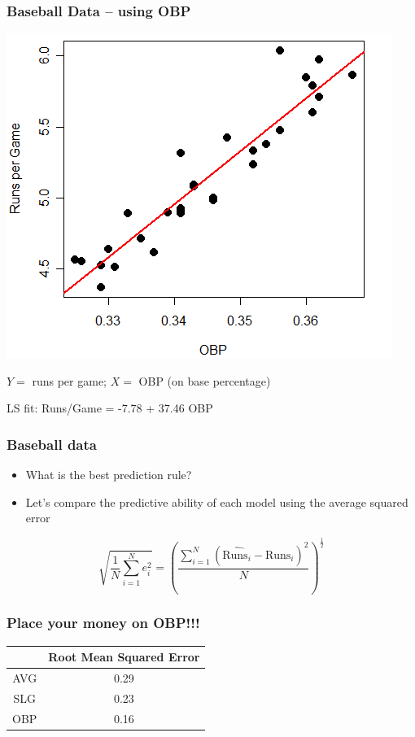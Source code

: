 \documentclass{beamer}
\newcommand{\bo}[1]{\textcolor{burntorange}{#1}}
\newcommand{\bi}{\begin{itemize}}
\newcommand{\ib}{\end{itemize}}
\begin{document}
\begin{frame}
\frametitle{Baseball Data -- using OBP} 

\vspace{-5.8mm}
\begin{center}
\includegraphics[scale=0.42]{figures/OBPR.png}
\end{center}

\vspace{-5.8mm}
$Y=$ runs per game; $X=$ OBP (on base percentage)

\vspace{1mm}
LS fit: {\color{red} Runs/Game = -7.78 + 37.46 OBP}
\end{frame}


\begin{frame}
\frametitle{Baseball data}
\bi
\item {\bo{ What is the best prediction rule?}}
\item Let's compare the predictive ability of each model using the average squared error
\ib

$$
\sqrt{\frac{1}{N}\sum_{i=1}^N{e_i^2}}  = \left(\frac{\sum_{i=1}^N{\left(\widehat{\text{Runs}_i} - \text{Runs}_i \right)^2}}{N}\right)^{\frac{1}{2}}
$$
\end{frame}

\begin{frame}
\frametitle{Place your money on OBP!!!}
\begin{center}
{\Large
\begin{tabular}{cc}
\hline
& Root Mean Squared Error \\
\hline 
AVG & 0.29 \\
SLG & 0.23 \\
{\bo{ OBP}} & {\bo{ 0.16}} \\
\hline
\end{tabular}
}
\end{center}
\end{frame}
\end{document}
